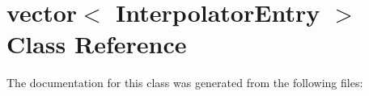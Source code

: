 \hypertarget{classvector_3_01InterpolatorEntry_01_4}{
\section{vector$<$ Interpolator\-Entry $>$ Class Reference}
\label{classvector_3_01InterpolatorEntry_01_4}
}


The documentation for this class was generated from the following files: